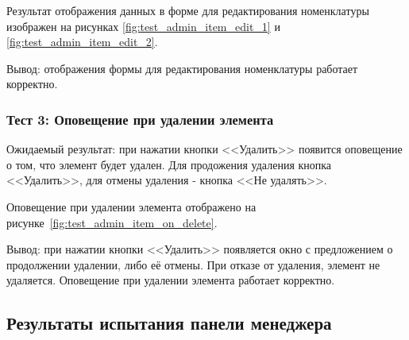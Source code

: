 Результат отображения данных в форме для редактирования номенклатуры изображен на рисунках \ref{fig:test_admin_item_edit_1} и \ref{fig:test_admin_item_edit_2}.







Вывод: отображения формы для редактирования номенклатуры работает корректно.

\subsubsection*{Тест 3: Оповещение при удалении элемента}

Ожидаемый результат: при нажатии кнопки <<Удалить>> появится оповещение о том, что элемент будет удален.
Для продожения удаления кнопка <<Удалить>>, для отмены удаления - кнопка <<Не удалять>>.

Оповещение при удалении элемента отображено на рисунке~\ref{fig:test_admin_item_on_delete}.




Вывод: при нажатии кнопки <<Удалить>> появляется окно с предложением о продолжении удалении, либо её отмены.
При отказе от удаления, элемент не удаляется. Оповещение при удалении элемента работает корректно.

\subsection{Результаты испытания панели менеджера}

